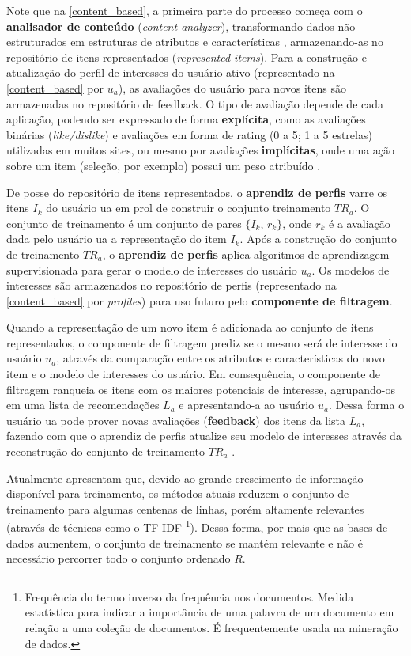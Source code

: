 \documentclass[12pt, openright, oneside, a4paper, brazil]{abntex2}
\begin{document}
Note que na \autoref{content_based}, a primeira parte do processo começa com o \textbf{analisador de conteúdo} (\textit{content analyzer}), transformando dados não estruturados em estruturas de atributos e características \cite{lops2011content, mladenic1999text}, armazenando-as no repositório de itens representados (\textit{represented items}). Para a construção e atualização do perfil de interesses do usuário ativo (representado na \autoref{content_based} por $u_{a}$), as avaliações do usuário para novos itens são armazenadas no repositório de feedback. O tipo de avaliação depende de cada aplicação, podendo ser expressado de forma \textbf{explícita}, como as avaliações binárias (\textit{like/dislike}) e avaliações em forma de rating (0 a 5; 1 a 5 estrelas) utilizadas em muitos sites, ou mesmo por avaliações \textbf{implícitas}, onde uma ação sobre um item (seleção, por exemplo) possui um peso atribuído \cite{pazzani2007content}.

De posse do repositório de itens representados, o \textbf{aprendiz de perfis} varre os itens $I_{k}$ do usuário ua em prol de construir o conjunto treinamento $TR_{a}$. O conjunto de treinamento é um conjunto de pares $\lbrace I_{k}$, $r_{k} \rbrace$, onde $r_{k}$ é a avaliação dada pelo usuário ua a representação do item $I_{k}$. Após a construção do conjunto de treinamento $TR_{a}$, o \textbf{aprendiz de perfis} aplica algoritmos de aprendizagem supervisionada para gerar o modelo de interesses do usuário $u_{a}$. Os modelos de interesses são armazenados no repositório de perfis (representado na \autoref{content_based} por \textit{profiles}) para uso futuro pelo \textbf{componente de filtragem}.

Quando a representação de um novo item é adicionada ao conjunto de itens representados, o componente de filtragem prediz se o mesmo será de interesse do usuário $u_{a}$, através da comparação entre os atributos e características do novo item e o modelo de interesses do usuário. Em consequência, o componente de filtragem ranqueia os itens com os maiores potenciais de interesse, agrupando-os em uma lista de recomendações $L_{a}$ e apresentando-a ao usuário $u_{a}$. Dessa forma o usuário ua pode prover novas avaliações (\textbf{feedback}) dos itens da lista $L_{a}$, fazendo com que o aprendiz de perfis atualize seu modelo de interesses através da reconstrução do conjunto de treinamento $TR_{a}$ \cite{lops2011content}.

Atualmente  apresentam que, devido ao grande crescimento de informação disponível para treinamento, os métodos atuais reduzem o conjunto de treinamento para algumas centenas de linhas, porém altamente relevantes (através de técnicas como o TF-IDF \footnote{Frequência do termo inverso da frequência nos documentos. Medida estatística para indicar a importância de uma palavra de um documento em relação a uma coleção de documentos. É frequentemente usada na mineração de dados.}). Dessa forma, por mais que as bases de dados aumentem, o conjunto de treinamento se mantém relevante e não é necessário percorrer todo o conjunto ordenado $R$.
\end{document}
